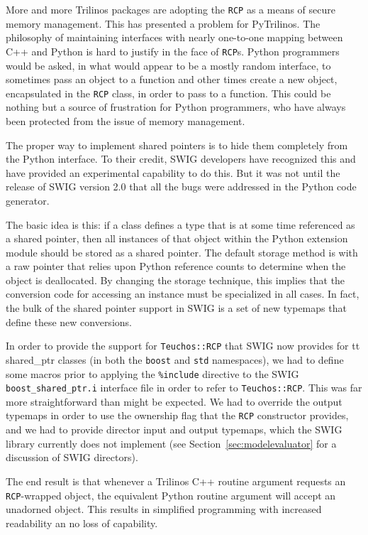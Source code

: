 \documentclass[11pt]{article}
\begin{document}
More and more Trilinos packages are adopting the {\tt RCP} as a means of secure memory management.  This has presented a problem for PyTrilinos.  The philosophy of maintaining interfaces with nearly one-to-one mapping between C++ and Python is hard to justify in the face of {\tt RCP}s.  Python programmers would be asked, in what would appear to be a mostly random interface, to sometimes pass an object to a function and other times create a new object, encapsulated in the {\tt RCP} class, in order to pass to a function.  This could be nothing but a source of frustration for Python programmers, who have always been protected from the issue of memory management.

The proper way to implement shared pointers is to hide them completely from the Python interface.  To their credit, SWIG developers have recognized this and have provided an experimental capability to do this.  But it was not until the release of SWIG version 2.0 that all the bugs were addressed in the Python code generator.

The basic idea is this: if a class defines a type that is at some time referenced as a shared pointer, then all instances of that object within the Python extension module should be stored as a shared pointer.  The default storage method is with a raw pointer that relies upon Python reference counts to determine when the object is deallocated.  By changing the storage technique, this implies that the conversion code for accessing an instance must be specialized in all cases.  In fact, the bulk of the shared pointer support in SWIG is a set of new typemaps that define these new conversions.

In order to provide the support for {\tt Teuchos::RCP} that SWIG now provides for {tt shared\_ptr} classes (in both the {\tt boost} and {\tt std} namespaces), we had to define some macros prior to applying the {\tt \%include} directive to the SWIG {\tt boost\_shared\_ptr.i} interface file in order to refer to {\tt Teuchos::RCP}.  This was far more straightforward than might be expected.  We had to override the output typemaps in order to use the ownership flag that the {\tt RCP} constructor provides, and we had to provide director input and output typemaps, which the SWIG library currently does not implement (see Section~\ref{sec:modelevaluator} for a discussion of SWIG directors).

The end result is that whenever a Trilinos C++ routine argument requests an {\tt RCP}-wrapped object, the equivalent Python routine argument will accept an unadorned object.  This results in simplified programming with increased readability an no loss of capability.
\end{document}
